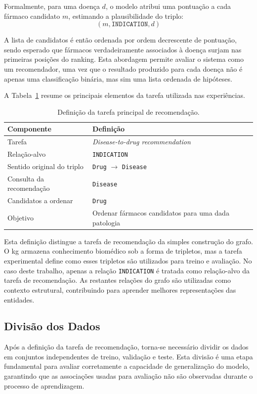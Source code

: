 Formalmente, para uma doença \(d\), o modelo atribui uma pontuação a cada fármaco candidato \(m\), estimando a plausibilidade do triplo:
\[(m, \texttt{INDICATION}, d)\]

A lista de candidatos é então ordenada por ordem decrescente de pontuação, sendo esperado que fármacos verdadeiramente associados à doença surjam nas primeiras posições do ranking. Esta abordagem permite avaliar o sistema como um recomendador, uma vez que o resultado produzido para cada doença não é apenas uma classificação binária, mas sim uma lista ordenada de hipóteses.

A Tabela~\ref{tab:definicao_tarefa_recomendacao} resume os principais elementos da tarefa utilizada nas experiências.

\begin{table}[H]
\centering
\caption{Definição da tarefa principal de recomendação.}
\label{tab:definicao_tarefa_recomendacao}
\begin{tabular}{|l|p{8cm}|}
\hline
\rowcolor[HTML]{EFEFEF}
\textbf{Componente} & \textbf{Definição} \\ \hline
Tarefa & \emph{Disease-to-drug recommendation} \\ \hline
Relação-alvo & \texttt{INDICATION} \\ \hline
Sentido original do triplo & \texttt{Drug} $\rightarrow$ \texttt{Disease} \\ \hline
Consulta da recomendação & \texttt{Disease} \\ \hline
Candidatos a ordenar & \texttt{Drug} \\ \hline
Objetivo & Ordenar fármacos candidatos para uma dada patologia \\ \hline
\end{tabular}
\end{table}

Esta definição distingue a tarefa de recomendação da simples construção do grafo. O \acrshort{kg} armazena conhecimento biomédico sob a forma de tripletos, mas a tarefa experimental define como esses tripletos são utilizados para treino e avaliação. No caso deste trabalho, apenas a relação \texttt{INDICATION} é tratada como relação-alvo da tarefa de recomendação. As restantes relações do grafo são utilizadas como contexto estrutural, contribuindo para aprender melhores representações das entidades.

\subsection{Divisão dos Dados}
\label{subsec:divisao-dados}
Após a definição da tarefa de recomendação, torna-se necessário dividir os dados em conjuntos independentes de treino, validação e teste. Esta divisão é uma etapa fundamental para avaliar corretamente a capacidade de generalização do modelo, garantindo que as associações usadas para avaliação não são observadas durante o processo de aprendizagem.

